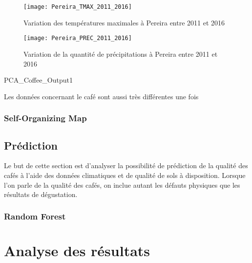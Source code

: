 \begin{figure}[H]
	\texttt{[image: Pereira\_TMAX\_2011\_2016]}
	\caption{\label{Tmax_Pereira} Variation des températures maximales à Pereira entre 2011 et 2016}
\end{figure}


\begin{figure}[H]
	\texttt{[image: Pereira\_PREC\_2011\_2016]}
	\caption{\label{PREC_Pereira} Variation de la quantité de précipitations à Pereira entre 2011 et 2016}
\end{figure}



PCA_Coffee_Output1

\noindent Les données concernant le café sont aussi très différentes une fois 

\newpage
\subsection{Self-Organizing Map}










\section{Prédiction}
Le but de cette section est d'analyser la possibilité de prédiction de la qualité des cafés à l'aide des données climatiques et de qualité de sols à disposition. Lorsque l'on parle de la qualité des cafés, on inclue autant les défauts physiques que les résultats de dégustation. 

\subsection{Random Forest}



\chapter{Analyse des résultats}



